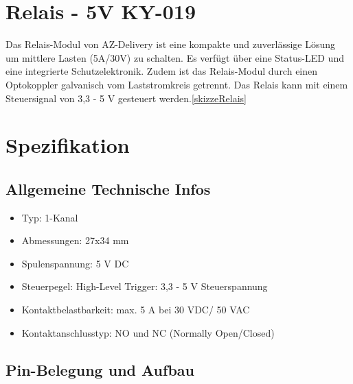 \section{Relais - 5V KY-019}
Das Relais-Modul von AZ-Delivery ist eine kompakte und zuverlässige Lösung um mittlere Lasten (5A/30V) zu schalten. Es verfügt über eine Status-LED und eine integrierte Schutzelektronik. Zudem ist das Relais-Modul durch einen Optokoppler galvanisch vom Laststromkreis getrennt. Das Relais kann mit einem Steuersignal von 3,3 - 5 V gesteuert werden.\ref{skizzeRelais}
\cite{Relais:2025}

\section{Spezifikation}
\subsection*{Allgemeine Technische Infos}
\begin{itemize}
	\item Typ: 1-Kanal
	\item Abmessungen: 27x34 mm
	\item Spulenspannung: 5 V DC
	\item Steuerpegel: High-Level Trigger: 3,3 - 5 V Steuerspannung
	\item Kontaktbelastbarkeit: max. 5 A bei 30 VDC/ 50 VAC
	\item Kontaktanschlusstyp: NO und NC (Normally Open/Closed)
\end{itemize}
\cite{Relais:2025}

\subsection*{Pin-Belegung und Aufbau}

